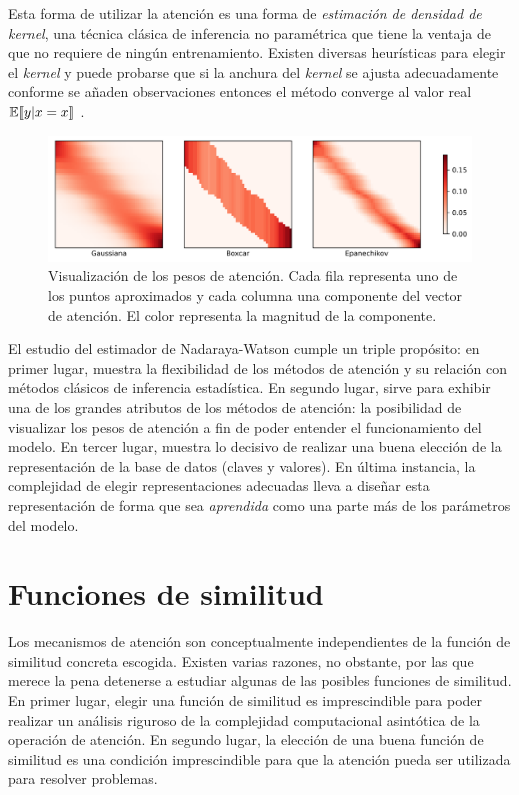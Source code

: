 Esta forma de utilizar la atención es una forma de \textit{estimación de densidad de kernel}, una técnica clásica de inferencia no paramétrica que tiene la ventaja de que no requiere de ningún entrenamiento. Existen diversas heurísticas para elegir el \textit{kernel} \cite{silverman1986density} y puede probarse que si la anchura del \textit{kernel} se ajusta adecuadamente conforme se añaden observaciones entonces el método converge al valor real \( \operatorname{\mathbb{E}} \llbracket y | x = x \rrbracket \) \cite{mack1982weak}.

\begin{figure}[tb]
    \centering
    \includegraphics[width=\textwidth]{figures/chapter4/kernel.png}
    \caption{Visualización de los pesos de atención. Cada fila representa uno de los puntos aproximados y cada columna una componente del vector de atención. El color representa la magnitud de la componente.}
    \label{fig:kernel}
\end{figure}

El estudio del estimador de Nadaraya-Watson cumple un triple propósito: en primer lugar, muestra la flexibilidad de los métodos de atención y su relación con métodos clásicos de inferencia estadística. En segundo lugar, sirve para exhibir una de los grandes atributos de los métodos de atención: la posibilidad de visualizar los pesos de atención a fin de poder entender el funcionamiento del modelo. En tercer lugar, muestra lo decisivo de realizar una buena elección de la representación de la base de datos (claves y valores). En última instancia, la complejidad de elegir representaciones adecuadas lleva a diseñar esta representación de forma que sea \textit{aprendida} como una parte más de los parámetros del modelo.

\section{Funciones de similitud}
Los mecanismos de atención son conceptualmente independientes de la función de similitud concreta escogida. Existen varias razones, no obstante, por las que merece la pena detenerse a estudiar algunas de las posibles funciones de similitud. En primer lugar, elegir una función de similitud es imprescindible para poder realizar un análisis riguroso de la complejidad computacional asintótica de la operación de atención. En segundo lugar, la elección de una buena función de similitud es una condición imprescindible para que la atención pueda ser utilizada para resolver problemas.

